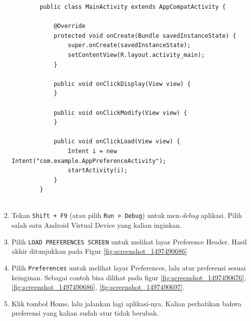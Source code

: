 \documentclass{scrartcl}
\begin{document}
\begin{enumerate}
\begin{verbatim}
		public class MainActivity extends AppCompatActivity {
		
			@Override
			protected void onCreate(Bundle savedInstanceState) {
				super.onCreate(savedInstanceState);
				setContentView(R.layout.activity_main);
			}
			
			public void onClickDisplay(View view) {
			}
			
			public void onClickModify(View view) {
			}
			
			public void onClickLoad(View view) {
				Intent i = new Intent("com.example.AppPreferenceActivity");
				startActivity(i);
			}
		}
		
		\end{verbatim}
		
		\item Tekan \texttt{Shift + F9} (atau pilih \texttt{Run > Debug}) untuk men-\textit{debug} aplikasi. Pilih salah satu Android Virtual Device yang kalian inginkan.
		
		\item Pilih \texttt{LOAD PREFERENCES SCREEN} untuk melihat layar Preference Header. Hasil akhir ditunjukkan pada Figur \ref{fig:screenshot_1497490686}
		
		\item Pilih \texttt{Preferences} untuk melihat layar Preferences, lalu atur preferensi sesuai keinginan. Sebagai contoh bisa dilihat pada figur \ref{fig:screenshot_1497490676}, \ref{fig:screenshot_1497490686}, \ref{fig:screenshot_1497490697}.
		
		\item Klik tombol Home, lalu jalankan lagi aplikasi-nya. Kalian perhatikan bahwa preferensi yang kalian sudah atur tidak berubah.
		

\end{enumerate}
\end{document}
